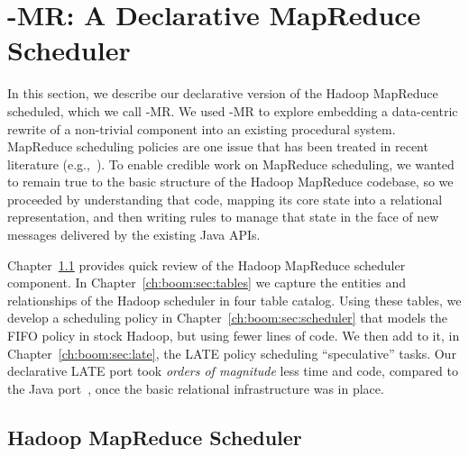 
\section{\BOOM-MR: A Declarative MapReduce Scheduler}
\label{ch:boom:sec:port}

In this section, we describe our declarative version of the Hadoop MapReduce
scheduled, which we call \BOOM-MR.  We used \BOOM-MR to explore embedding a
data-centric rewrite of a non-trivial component into an existing procedural
system.  MapReduce scheduling policies are one issue that has been treated in
recent literature (e.g.,~\cite{zaharia-late,delay-sched}).  To enable credible
work on MapReduce scheduling, we wanted to remain true to the basic structure
of the Hadoop MapReduce codebase, so we proceeded by understanding that code,
mapping its core state into a relational representation, and then writing
\OVERLOG rules to manage that state in the face of new messages delivered by
the existing Java APIs.  

Chapter~\ref{ch:boom:sec:hadoop} provides quick review of the Hadoop MapReduce
scheduler component.  In Chapter~\ref{ch:boom:sec:tables} we capture the
entities and relationships of the Hadoop scheduler in four table catalog.
Using these tables, we develop a scheduling policy in
Chapter~\ref{ch:boom:sec:scheduler} that models the FIFO policy in stock
Hadoop, but using fewer lines of code.  We then add to it, in
Chapter~\ref{ch:boom:sec:late}, the LATE policy scheduling ``speculative''
tasks.  Our declarative LATE port took {\em orders of magnitude} less time and
code, compared to the Java port~\cite{jira-2141}, once the basic relational
infrastructure was in place.

\subsection{Hadoop MapReduce Scheduler}
\label{ch:boom:sec:hadoop}

